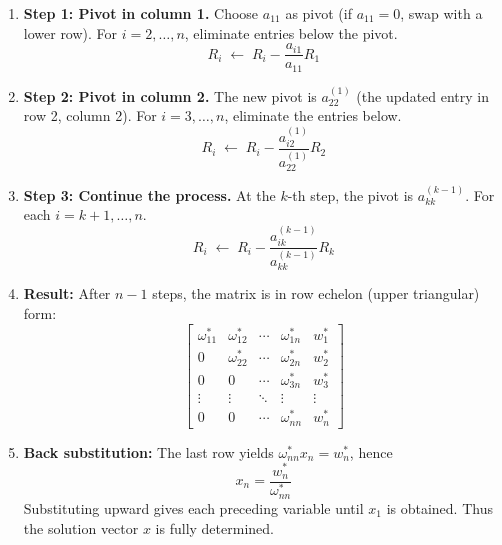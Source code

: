 \documentclass[../../../main.tex]{subfiles}
\begin{document}
\begin{enumerate}
    \item \textbf{Step 1: Pivot in column 1.}
          Choose $a_{11}$ as pivot (if $a_{11}=0$, swap with a lower row).
          For $i=2,\dots,n$, eliminate entries below the pivot.
          \begin{equation*}
              R_i \;\leftarrow\; R_i - \frac{a_{i1}}{a_{11}} R_1
          \end{equation*}
    \item \textbf{Step 2: Pivot in column 2.}
          The new pivot is $a_{22}^{(1)}$ (the updated entry in row 2, column 2).
          For $i=3,\dots,n$, eliminate the entries below.
          \begin{equation*}
              R_i \;\leftarrow\; R_i - \frac{a_{i2}^{(1)}}{a_{22}^{(1)}} R_2
          \end{equation*}
    \item \textbf{Step 3: Continue the process.}  At the $k$-th step, the pivot is $a_{kk}^{(k-1)}$.
          For each $i = k+1, \dots, n$.
          \begin{equation*}
              R_i \;\leftarrow\; R_i - \frac{a_{ik}^{(k-1)}}{a_{kk}^{(k-1)}} R_k
          \end{equation*}
    \item \textbf{Result:}
          After $n-1$ steps, the matrix is in row echelon (upper triangular) form:
          \[
              \begin{bmatrix}
                  \omega_{11}^{*} & \omega_{12}^{*} & \cdots & \omega_{1n}^{*} & w_1^{*} \\
                  0               & \omega_{22}^{*} & \cdots & \omega_{2n}^{*} & w_2^{*} \\
                  0               & 0               & \cdots & \omega_{3n}^{*} & w_3^{*} \\
                  \vdots          & \vdots          & \ddots & \vdots          & \vdots  \\
                  0               & 0               & \cdots & \omega_{nn}^{*} & w_n^{*}
              \end{bmatrix}
          \]

    \item \textbf{Back substitution:}
          The last row yields $\omega_{nn}^{*} x_n = w_n^{*}$, hence
          \[
              x_n = \frac{w_n^{*}}{\omega_{nn}^{*}}
          \]
          Substituting upward gives each preceding variable until $x_1$ is obtained.
          Thus the solution vector $x$ is fully determined.
\end{enumerate}
\end{document}
